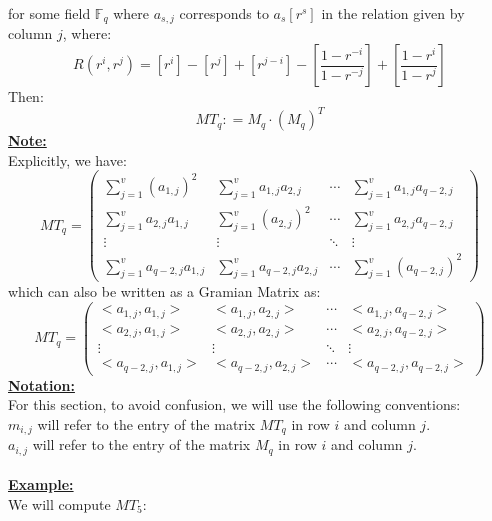 \documentclass[11pt]{article}
\theoremstyle{plain}
\theoremstyle{definition}
\begin{document}
for some field $\mathbb{F}_q$ where $a_{s,j}$ corresponds to $a_s [r^s]$ in the relation given by column $j$, where:
\begin{equation*}
R(r^{i},r^{j}) = [r^{i}] - [r^{j}] + [r^{j-i}] - [\frac{1-r^{-i}}{1-r^{-j}}] + [\frac{1-r^{i}}{1-r^{j}}]
\end{equation*}
Then:
\begin{equation*}
MT_q : = M_q \cdot (M_q) ^T
\end{equation*}
\textbf{\underline{Note:}} \\
Explicitly, we have:
\[ MT_q = \left( \begin{array}{cccc}

\sum\limits_{j=1}^{v} (a_{1,j}) ^2 & \sum\limits_{j=1}^{v} a_{1,j} a_{2,j}  & \cdots &  \sum\limits_{j=1}^{v} a_{1,j} a_{q-2,j} \\

\sum\limits_{j=1}^{v} a_{2,j} a_{1,j} &\sum\limits_{j=1}^{v} (a_{2,j}) ^2 & \cdots &\sum\limits_{j=1}^{v} a_{2,j} a_{q-2,j} \\

\vdots & \vdots  & \ddots &  \vdots \\

\sum\limits_{j=1}^{v} a_{q-2,j} a_{1,j}  & \sum\limits_{j=1}^{v} a_{q-2,j} a_{2,j}   & \cdots &  \sum\limits_{j=1}^{v} (a_{q-2,j}) ^2
   \end{array} \right)\] 
which can also be written as a Gramian Matrix as:
\[ MT_q = \left( \begin{array}{cccc}

< a_{1,j}, a_{1,j} > & < a_{1,j}, a_{2,j} >  & \cdots &  <a_{1,j}, a_{q-2,j}> \\

<a_{2,j}, a_{1,j}> &<a_{2,j},a_{2,j}> & \cdots &<a_{2,j}, a_{q-2,j}> \\

\vdots & \vdots  & \ddots &  \vdots \\

<a_{q-2,j}, a_{1,j}>  & <a_{q-2,j}, a_{2,j}>   & \cdots & <a_{q-2,j}, a_{q-2,j}>
\end{array} \right)\] 
\textbf{\underline{Notation:}}\\
 For this section, to avoid confusion, we will use the following conventions:\\
$m_{i,j}$ will refer to the entry of the matrix $MT_q$ in row $i$ and column $j$. \\
$a_{i,j}$ will refer to the entry of the matrix $M_q$ in row $i$ and column $j$.\\
\\
\textbf{\underline{Example:}} \\
We will compute $MT_5$:
\end{document}
